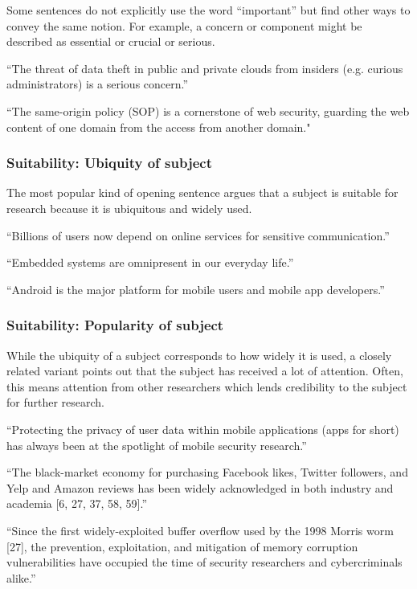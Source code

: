 \documentclass[sigconf]{acmart}
\begin{document}
	Some sentences do not explicitly use the word “important” but find other ways to convey the same notion. For example, a concern or component might be described as essential or crucial or serious.
	
	``The threat of data theft in public and private clouds from insiders (e.g. curious administrators) is a serious concern.''
	
	``The same-origin policy (SOP) is a cornerstone of web security, guarding the web content of one domain from the access from another domain."
	
	\subsubsection{Suitability: Ubiquity of subject}
	
	The most popular kind of opening sentence argues that a subject is suitable for research because it is ubiquitous and widely used.
	
	``Billions of users now depend on online services for sensitive communication.''
	
	``Embedded systems are omnipresent in our everyday life.''
	
	``Android is the major platform for mobile users and mobile app developers.''
	
	\subsubsection{Suitability: Popularity of subject}
	
	While the ubiquity of a subject corresponds to how widely it is used, a closely related variant points out that the subject has received a lot of attention. Often, this means attention from other researchers which lends credibility to the subject for further research.
	
	``Protecting the privacy of user data within mobile applications (apps for short) has always been at the spotlight of mobile security research.''
	
	``The black-market economy for purchasing Facebook likes, Twitter followers, and Yelp and Amazon reviews has been widely acknowledged in both industry and academia [6, 27, 37, 58, 59].''
	
	``Since the first widely-exploited buffer overflow used by the 1998 Morris worm [27], the prevention, exploitation, and mitigation of memory corruption vulnerabilities have occupied the time of security researchers and cybercriminals alike.''
	
\end{document}
